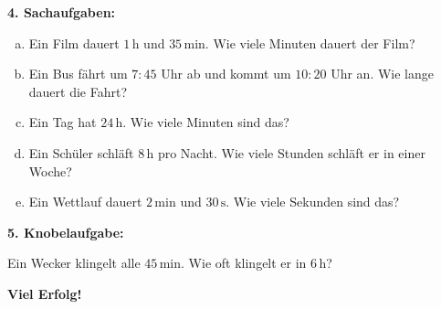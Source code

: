 \textbf{4. Sachaufgaben:}
\begin{enumerate}[a)]
    \item Ein Film dauert $1\,\mathrm{h}$ und $35\,\mathrm{min}$. Wie viele Minuten dauert der Film?
    \item Ein Bus fährt um $7\!:\!45$ Uhr ab und kommt um $10\!:\!20$ Uhr an. Wie lange dauert die Fahrt?
    \item Ein Tag hat $24\,\mathrm{h}$. Wie viele Minuten sind das?
    \item Ein Schüler schläft $8\,\mathrm{h}$ pro Nacht. Wie viele Stunden schläft er in einer Woche?
    \item Ein Wettlauf dauert $2\,\mathrm{min}$ und $30\,\mathrm{s}$. Wie viele Sekunden sind das?
\end{enumerate}

\vspace{0.5em}

\textbf{5. Knobelaufgabe:}

Ein Wecker klingelt alle $45\,\mathrm{min}$. Wie oft klingelt er in $6\,\mathrm{h}$?

\textbf{Viel Erfolg!}